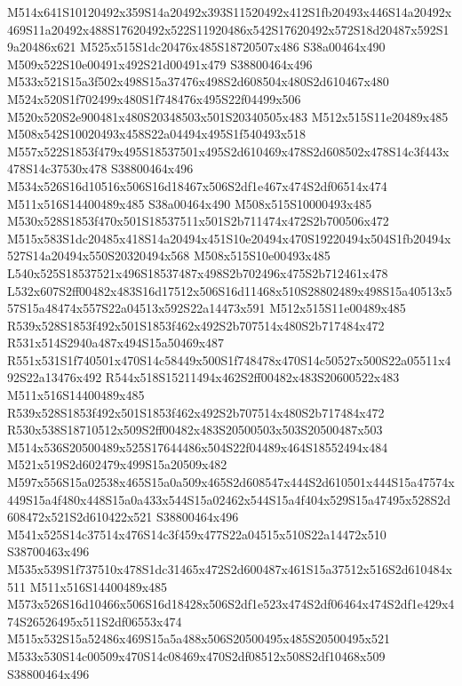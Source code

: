 \documentclass{article}
\begin{document}
\begin{multicols}{2}



M514x641S10120492x359S14a20492x393S11520492x412S1fb20493x446S14a20492x469S11a20492x488S17620492x522S11920486x542S17620492x572S18d20487x592S19a20486x621 M525x515S1dc20476x485S18720507x486 S38a00464x490 M509x522S10e00491x492S21d00491x479 S38800464x496 M533x521S15a3f502x498S15a37476x498S2d608504x480S2d610467x480 M524x520S1f702499x480S1f748476x495S22f04499x506 M520x520S2e900481x480S20348503x501S20340505x483 M512x515S11e20489x485 M508x542S10020493x458S22a04494x495S1f540493x518 M557x522S1853f479x495S18537501x495S2d610469x478S2d608502x478S14c3f443x478S14c37530x478 S38800464x496 M534x526S16d10516x506S16d18467x506S2df1e467x474S2df06514x474 M511x516S14400489x485 S38a00464x490 M508x515S10000493x485 M530x528S1853f470x501S18537511x501S2b711474x472S2b700506x472 M515x583S1dc20485x418S14a20494x451S10e20494x470S19220494x504S1fb20494x527S14a20494x550S20320494x568 M508x515S10e00493x485 L540x525S18537521x496S18537487x498S2b702496x475S2b712461x478 L532x607S2ff00482x483S16d17512x506S16d11468x510S28802489x498S15a40513x557S15a48474x557S22a04513x592S22a14473x591 M512x515S11e00489x485 R539x528S1853f492x501S1853f462x492S2b707514x480S2b717484x472 R531x514S2940a487x494S15a50469x487 R551x531S1f740501x470S14c58449x500S1f748478x470S14c50527x500S22a05511x492S22a13476x492 R544x518S15211494x462S2ff00482x483S20600522x483 M511x516S14400489x485 R539x528S1853f492x501S1853f462x492S2b707514x480S2b717484x472 R530x538S18710512x509S2ff00482x483S20500503x503S20500487x503 M514x536S20500489x525S17644486x504S22f04489x464S18552494x484 M521x519S2d602479x499S15a20509x482 M597x556S15a02538x465S15a0a509x465S2d608547x444S2d610501x444S15a47574x449S15a4f480x448S15a0a433x544S15a02462x544S15a4f404x529S15a47495x528S2d608472x521S2d610422x521 S38800464x496 M541x525S14c37514x476S14c3f459x477S22a04515x510S22a14472x510 S38700463x496 M535x539S1f737510x478S1dc31465x472S2d600487x461S15a37512x516S2d610484x511 M511x516S14400489x485 M573x526S16d10466x506S16d18428x506S2df1e523x474S2df06464x474S2df1e429x474S26526495x511S2df06553x474 M515x532S15a52486x469S15a5a488x506S20500495x485S20500495x521 M533x530S14c00509x470S14c08469x470S2df08512x508S2df10468x509 S38800464x496


\end{multicols}
\end{document}
